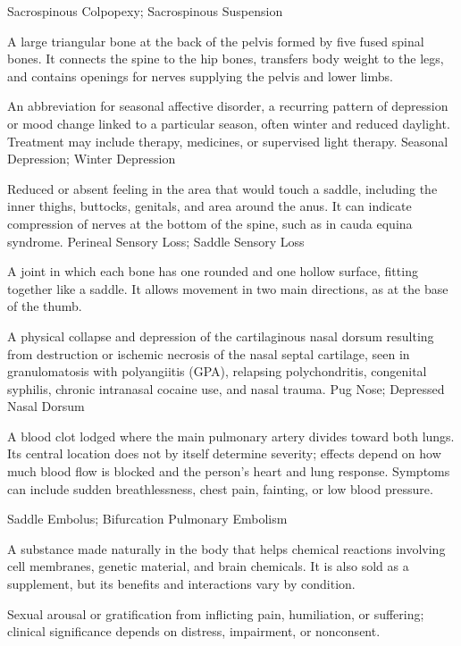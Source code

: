 \synonyms
Sacrospinous Colpopexy; Sacrospinous Suspension

 A large triangular bone at the back of the pelvis formed by five fused spinal bones. It connects the spine to the hip bones, transfers body weight to the legs, and contains openings for nerves supplying the pelvis and lower limbs.

 An abbreviation for seasonal affective disorder, a recurring pattern of depression or mood change linked to a particular season, often winter and reduced daylight. Treatment may include therapy, medicines, or supervised light therapy.
\synonyms
Seasonal Depression; Winter Depression

 Reduced or absent feeling in the area that would touch a saddle, including the inner thighs, buttocks, genitals, and area around the anus. It can indicate compression of nerves at the bottom of the spine, such as in cauda equina syndrome.
\synonyms
Perineal Sensory Loss; Saddle Sensory Loss

 A joint in which each bone has one rounded and one hollow surface, fitting together like a saddle. It allows movement in two main directions, as at the base of the thumb.

 A physical collapse and depression of the cartilaginous nasal dorsum resulting from destruction or ischemic necrosis of the nasal septal cartilage, seen in granulomatosis with polyangiitis (GPA), relapsing polychondritis, congenital syphilis, chronic intranasal cocaine use, and nasal trauma.
\synonyms
Pug Nose; Depressed Nasal Dorsum

 A blood clot lodged where the main pulmonary artery divides toward both lungs. Its central location does not by itself determine severity; effects depend on how much blood flow is blocked and the person's heart and lung response. Symptoms can include sudden breathlessness, chest pain, fainting, or low blood pressure.

\synonyms
Saddle Embolus; Bifurcation Pulmonary Embolism

 A substance made naturally in the body that helps chemical reactions involving cell membranes, genetic material, and brain chemicals. It is also sold as a supplement, but its benefits and interactions vary by condition.

 Sexual arousal or gratification from inflicting pain, humiliation, or suffering; clinical significance depends on distress, impairment, or nonconsent.

